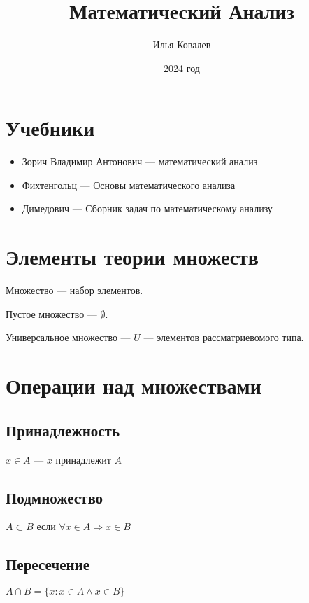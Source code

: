 \documentclass{article}
\begin{document}
\title{Математический Анализ}
\author{Илья Ковалев}
\date{2024 год}
\maketitle



\section{Учебники}

\begin{itemize}
\item Зорич Владимир Антонович --- математический анализ
\item Фихтенгольц --- Основы математического анализа
\item Димедович --- Сборник задач по математическому анализу
\end{itemize}

\section{Элементы теории множеств}


Множество --- набор элементов.

Пустое множество --- $\emptyset$.

Универсальное множество --- $U$ --- элементов рассматриевомого типа.

\section{Операции над множествами}

\subsection{Принадлежность}

$x \in A$ --- $x$ принадлежит $A$

\subsection{Подмножество}

$A \subset B$ если
$\forall x \in A \Rightarrow x \in B$

\subsection{Пересечение}

$A \cap B = \{x: x \in A \land x \in B\}$
\end{document}
